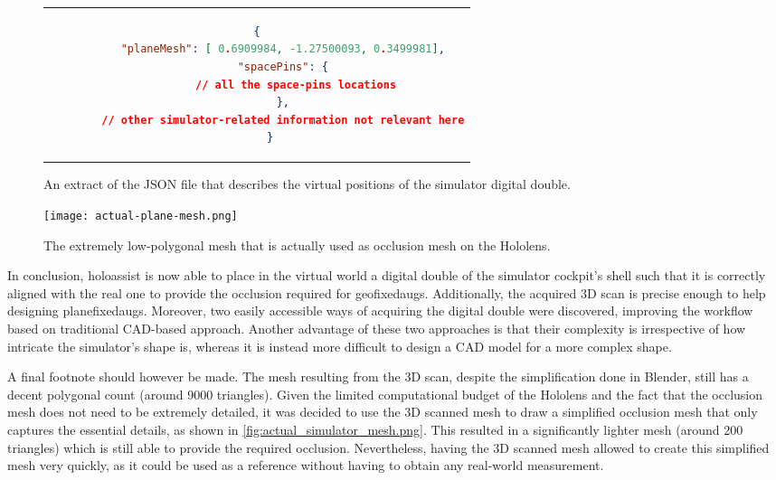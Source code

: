 \begin{figure}[t]
  \centering
  \begin{tabular}{c}
  \begin{lstlisting}[language=json]
    {
        "planeMesh": [ 0.6909984, -1.27500093, 0.3499981],
        "spacePins": {
            // all the space-pins locations
        },
        // other simulator-related information not relevant here
    }
  \end{lstlisting}
  \end{tabular}
  \caption{An extract of the JSON file that describes the virtual positions of the simulator digital double.}\label{lst:sim_digita_double_virtual_positions_json}
\end{figure}

\begin{figure}[t]
  \centering
  \texttt{[image: actual-plane-mesh.png]}
  \caption{The extremely low-polygonal mesh that is actually used as occlusion mesh on the Hololens.}\label{fig:actual_simulator_mesh.png}
\end{figure}

In conclusion, \gls{holoassist} is now able to place in the virtual world a digital double of the simulator cockpit's shell such that it is correctly aligned with the real one to provide the occlusion required for \glspl{geofixedaug}. Additionally, the acquired 3D scan is precise enough to help designing \glspl{planefixedaug}. Moreover, two easily accessible ways of acquiring the digital double were discovered, improving the workflow based on traditional \gls{CAD}-based approach. Another advantage of these two approaches is that their complexity is irrespective of how intricate the simulator's shape is, whereas it is instead more difficult to design a \gls{CAD} model for a more complex shape.

A final footnote should however be made. The mesh resulting from the 3D scan, despite the simplification done in Blender, still has a decent polygonal count (around 9000 triangles). Given the limited computational budget of the Hololens and the fact that the occlusion mesh does not need to be extremely detailed, it was decided to use the 3D scanned mesh to draw a simplified occlusion mesh that only captures the essential details, as shown in \autoref{fig:actual_simulator_mesh.png}. This resulted in a significantly lighter mesh (around 200 triangles) which is still able to provide the required occlusion. Nevertheless, having the 3D scanned mesh allowed to create this simplified mesh very quickly, as it could be used as a reference without having to obtain any real-world measurement.

